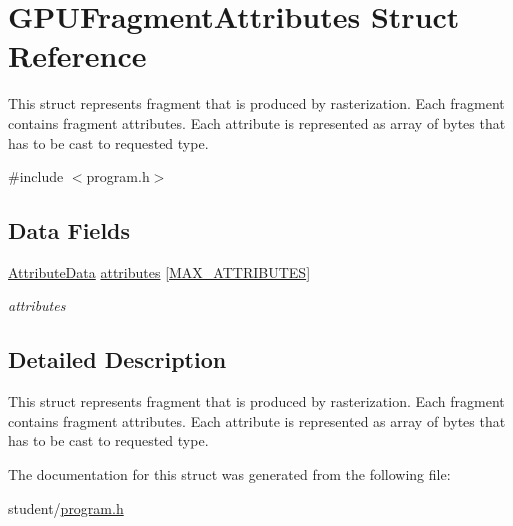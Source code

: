 \hypertarget{structGPUFragmentAttributes}{}\section{G\+P\+U\+Fragment\+Attributes Struct Reference}
\label{structGPUFragmentAttributes}


This struct represents fragment that is produced by rasterization. Each fragment contains fragment attributes. Each attribute is represented as array of bytes that has to be cast to requested type.  




{\ttfamily \#include $<$program.\+h$>$}

\subsection*{Data Fields}
\begin{DoxyCompactItemize}
\item 
\hyperlink{fwd_8h_aa9879a02fad39161594e48222b5d9660}{Attribute\+Data} \hyperlink{structGPUFragmentAttributes_af2ea62c0bcd0c007607fecb9ca8f73d7}{attributes} \mbox{[}\hyperlink{fwd_8h_a4d992a1f9192388588184753115f6c03}{M\+A\+X\+\_\+\+A\+T\+T\+R\+I\+B\+U\+T\+ES}\mbox{]}\hypertarget{structGPUFragmentAttributes_af2ea62c0bcd0c007607fecb9ca8f73d7}{}\label{structGPUFragmentAttributes_af2ea62c0bcd0c007607fecb9ca8f73d7}

\begin{DoxyCompactList}\small\item\em attributes \end{DoxyCompactList}\end{DoxyCompactItemize}


\subsection{Detailed Description}
This struct represents fragment that is produced by rasterization. Each fragment contains fragment attributes. Each attribute is represented as array of bytes that has to be cast to requested type. 

The documentation for this struct was generated from the following file\+:\begin{DoxyCompactItemize}
\item 
student/\hyperlink{program_8h}{program.\+h}\end{DoxyCompactItemize}
